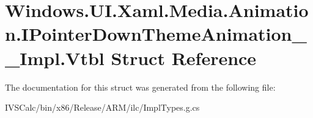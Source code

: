 \hypertarget{struct_windows_1_1_u_i_1_1_xaml_1_1_media_1_1_animation_1_1_i_pointer_down_theme_animation_____impl_1_1_vtbl}{}\section{Windows.\+U\+I.\+Xaml.\+Media.\+Animation.\+I\+Pointer\+Down\+Theme\+Animation\+\_\+\+\_\+\+Impl.\+Vtbl Struct Reference}
\label{struct_windows_1_1_u_i_1_1_xaml_1_1_media_1_1_animation_1_1_i_pointer_down_theme_animation_____impl_1_1_vtbl}


The documentation for this struct was generated from the following file\+:\begin{DoxyCompactItemize}
\item 
I\+V\+S\+Calc/bin/x86/\+Release/\+A\+R\+M/ilc/Impl\+Types.\+g.\+cs\end{DoxyCompactItemize}
